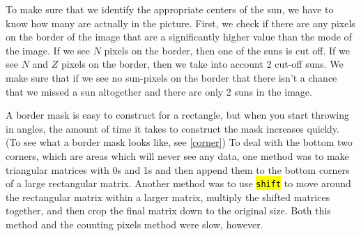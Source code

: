 \documentclass[10pt]{scrartcl}
\begin{document}
To make sure that we identify the appropriate centers of the sun, we have to know how many are actually in the picture. First, we check if there are any pixels on the border of the image that are a significantly higher value than the mode of the image. If we see $N$ pixels on the border, then one of the suns is cut off. If we see $N$ and $Z$ pixels on the border, then we take into account 2 cut-off suns. We make sure that if we see no sun-pixels on the border that there isn't a chance that we missed a sun altogether and there are only 2 suns in the image. 

\begin{figure}[!ht]
\end{figure}

A border mask is easy to construct for a rectangle, but when you start throwing in angles, the amount of time it takes to construct the mask increases quickly. (To see what a border mask looks like, see \cref{corner}) To deal with the bottom two corners, which are areas which will never see any data, one method was to make triangular matrices with 0s and 1s and then append them to the bottom corners of a large rectangular matrix. Another method was to use \hl{\texttt{shift}} to move around the rectangular matrix within a larger matrix, multiply the shifted matrices together, and then crop the final matrix down to the original size. Both this method and the counting pixels method were slow, however.
\end{document}
